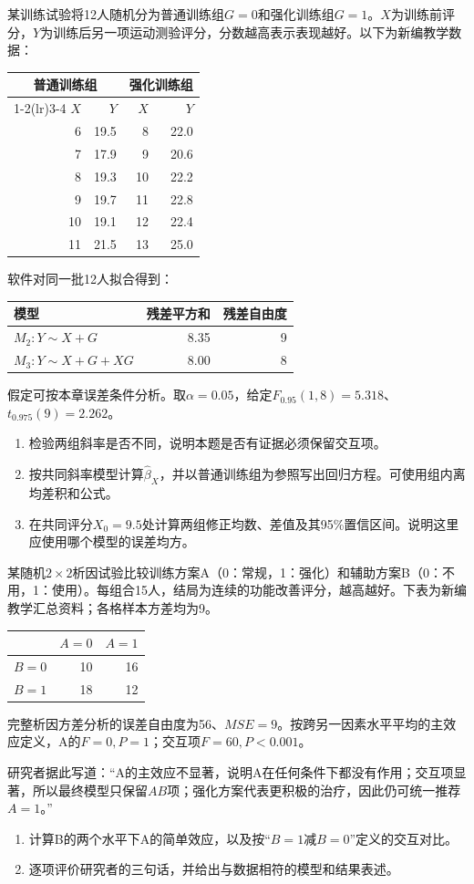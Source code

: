 某训练试验将12人随机分为普通训练组\(G=0\)和强化训练组\(G=1\)。\(X\)为训练前评分，\(Y\)为训练后另一项运动测验评分，分数越高表示表现越好。以下为新编教学数据：
\begin{center}\begin{tabular}{rrrr}
\toprule \multicolumn{2}{c}{普通训练组}&\multicolumn{2}{c}{强化训练组}\\
\cmidrule(lr){1-2}\cmidrule(lr){3-4}
\(X\)&\(Y\)&\(X\)&\(Y\)\\\midrule
6&19.5&8&22.0\\
7&17.9&9&20.6\\
8&19.3&10&22.2\\
9&19.7&11&22.8\\
10&19.1&12&22.4\\
11&21.5&13&25.0\\\bottomrule
\end{tabular}\end{center}
软件对同一批12人拟合得到：
\begin{center}\begin{tabular}{lrr}
\toprule 模型&残差平方和&残差自由度\\\midrule
\(M_2:Y\sim X+G\)&8.35&9\\
\(M_3:Y\sim X+G+XG\)&8.00&8\\\bottomrule
\end{tabular}\end{center}
假定可按本章误差条件分析。取\(\alpha=0.05\)，给定\(F_{0.95}(1,8)=5.318\)、\(t_{0.975}(9)=2.262\)。
\begin{enumerate}
\item 检验两组斜率是否不同，说明本题是否有证据必须保留交互项。
\item 按共同斜率模型计算\(\widehat\beta_X\)，并以普通训练组为参照写出回归方程。可使用组内离均差积和公式。
\item 在共同评分\(X_0=9.5\)处计算两组修正均数、差值及其95\%置信区间。说明这里应使用哪个模型的误差均方。
\end{enumerate}

某随机\(2\times2\)析因试验比较训练方案A（0：常规，1：强化）和辅助方案B（0：不用，1：使用）。每组合15人，结局为连续的功能改善评分，越高越好。下表为新编教学汇总资料；各格样本方差均为9。
\begin{center}\begin{tabular}{lrr}
\toprule &\(A=0\)&\(A=1\)\\\midrule
\(B=0\)&10&16\\
\(B=1\)&18&12\\\bottomrule
\end{tabular}\end{center}
完整析因方差分析的误差自由度为56、\(MSE=9\)。按跨另一因素水平平均的主效应定义，A的\(F=0,P=1\)；交互项\(F=60,P<0.001\)。

研究者据此写道：“A的主效应不显著，说明A在任何条件下都没有作用；交互项显著，所以最终模型只保留\(AB\)项；强化方案代表更积极的治疗，因此仍可统一推荐\(A=1\)。”
\begin{enumerate}
\item 计算B的两个水平下A的简单效应，以及按“\(B=1\)减\(B=0\)”定义的交互对比。
\item 逐项评价研究者的三句话，并给出与数据相符的模型和结果表述。
\end{enumerate}

